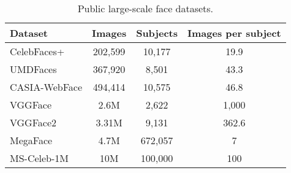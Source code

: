\documentclass[conference]{IEEEtran}
\begin{document}
\begin{table}[tb]
    \centering
    \caption{Public large-scale face datasets.}
    \label{tab:datasets}
    \begin{tabular}{@{}lccc@{}}
    \toprule
    Dataset                             & Images           & Subjects           & Images per subject \\ \midrule
    CelebFaces+ \cite{sun2014deep}      & 202,599          & 10,177             & 19.9               \\
    UMDFaces \cite{bansal2017umdfaces}  & 367,920          & 8,501              & 43.3               \\
    CASIA-WebFace \cite{yi2014learning} & 494,414          & 10,575             & 46.8               \\
    VGGFace \cite{parkhi2015deep}       & 2.6M             & 2,622              & 1,000              \\
    VGGFace2 \cite{cao2017vggface2}     & 3.31M            & 9,131              & 362.6              \\
    MegaFace \cite{nech2017level}       & 4.7M             & 672,057            & 7                  \\
    MS-Celeb-1M \cite{guo2016ms}        & 10M              & 100,000            & 100                \\ \bottomrule
    \end{tabular}
\end{table}
\end{document}
